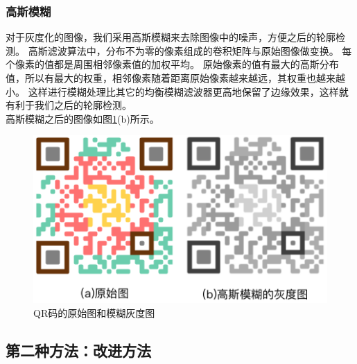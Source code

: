 \subsubsection{高斯模糊}
对于灰度化的图像，我们采用高斯模糊来去除图像中的噪声，方便之后的轮廓检测。
高斯滤波算法中，分布不为零的像素组成的卷积矩阵与原始图像做变换。
每个像素的值都是周围相邻像素值的加权平均。
原始像素的值有最大的高斯分布值，所以有最大的权重，相邻像素随着距离原始像素越来越远，其权重也越来越小。
这样进行模糊处理比其它的均衡模糊滤波器更高地保留了边缘效果，这样就有利于我们之后的轮廓检测。\\
高斯模糊之后的图像如图\ref{fig:blured}(b)所示。
\begin{figure}[h]
\centering
\includegraphics[width=0.9\linewidth]{blured}
\caption[blured]{QR码的原始图和模糊灰度图}
\label{fig:blured}
\end{figure}


\subsection{第二种方法：改进方法}
